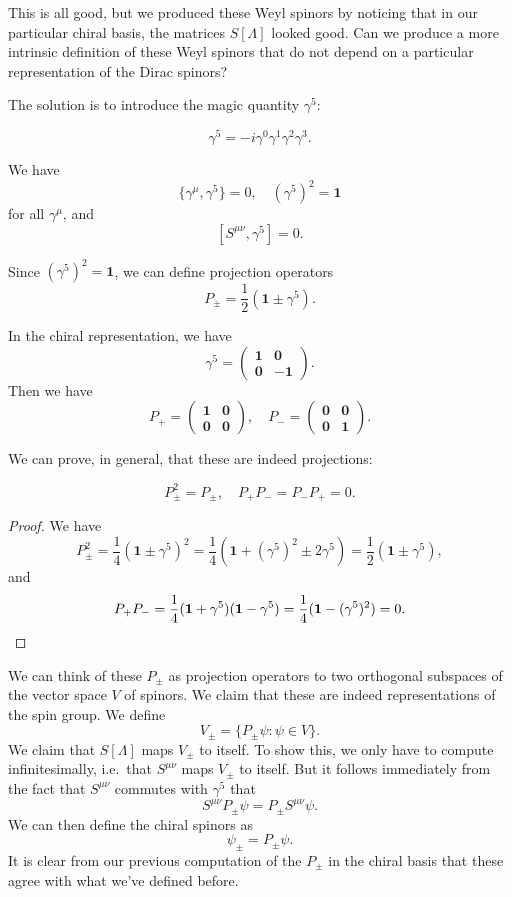 \documentclass[a4paper]{article}
\begin{document}
This is all good, but we produced these Weyl spinors by noticing that in our particular chiral basis, the matrices $S[\Lambda]$ looked good. Can we produce a more intrinsic definition of these Weyl spinors that do not depend on a particular representation of the Dirac spinors?

The solution is to introduce the magic quantity $\gamma^5$:
\begin{defi}[$\gamma^5$]
  \[
    \gamma^5 = -i \gamma^0 \gamma^1 \gamma^2 \gamma^3.
  \]
\end{defi}

\begin{prop}
  We have
  \[
    \{\gamma^\mu, \gamma^5\} = 0,\quad (\gamma^5)^2 = \mathbf{1}
  \]
  for all $\gamma^\mu$, and
  \[
    [S^{\mu\nu}, \gamma^5] = 0.
  \]
\end{prop}

Since $(\gamma^5)^2 = \mathbf{1}$, we can define projection operators
\[
  P_{\pm} = \frac{1}{2}(\mathbf{1} \pm \gamma^5).
\]
\begin{eg}
  In the chiral representation, we have
  \[
    \gamma^5 =
    \begin{pmatrix}
      \mathbf{1} & \mathbf{0}\\
      \mathbf{0} & -\mathbf{1}
    \end{pmatrix}.
  \]
  Then we have
  \[
    P_+ =
    \begin{pmatrix}
      \mathbf{1} & \mathbf{0}\\
      \mathbf{0} & \mathbf{0}
    \end{pmatrix},
    \quad P_- =
    \begin{pmatrix}
      \mathbf{0} & \mathbf{0}\\
      \mathbf{0} & \mathbf{1}
    \end{pmatrix}.
  \]
\end{eg}
We can prove, in general, that these are indeed projections:
\begin{prop}
  \[
    P_\pm^2 = P_{\pm}, \quad P_+ P_- = P_- P_+ = 0.
  \]
\end{prop}

\begin{proof}
  We have
  \[
    P_{\pm}^2 = \frac{1}{4}(\mathbf{1} \pm \gamma^5)^2 = \frac{1}{4}(\mathbf{1} + (\gamma^5)^2 \pm 2 \gamma^5) = \frac{1}{2}(\mathbf{1} \pm \gamma^5),
  \]
  and
  \[
    P_+P_- = \frac{1}{4}(\mathbf{1} + \gamma^5)(\mathbf{1} - \gamma^5) = \frac{1}{4}(\mathbf{1} - (\gamma^5)^2) = 0. \qedhere
  \]
\end{proof}
We can think of these $P_{\pm}$ as projection operators to two orthogonal subspaces of the vector space $V$ of spinors. We claim that these are indeed representations of the spin group. We define
\[
  V_{\pm} = \{P_{\pm} \psi: \psi \in V\}.
\]
We claim that $S[\Lambda]$ maps $V_{\pm}$ to itself. To show this, we only have to compute infinitesimally, i.e.\ that $S^{\mu\nu}$ maps $V_{\pm}$ to itself. But it follows immediately from the fact that $S^{\mu\nu}$ commutes with $\gamma^5$ that
\[
  S^{\mu\nu} P_{\pm}\psi = P_{\pm} S^{\mu\nu} \psi.
\]
We can then define the chiral spinors as
\[
  \psi_{\pm} = P_{\pm}\psi.
\]
It is clear from our previous computation of the $P_{\pm}$ in the chiral basis that these agree with what we've defined before.
\end{document}
